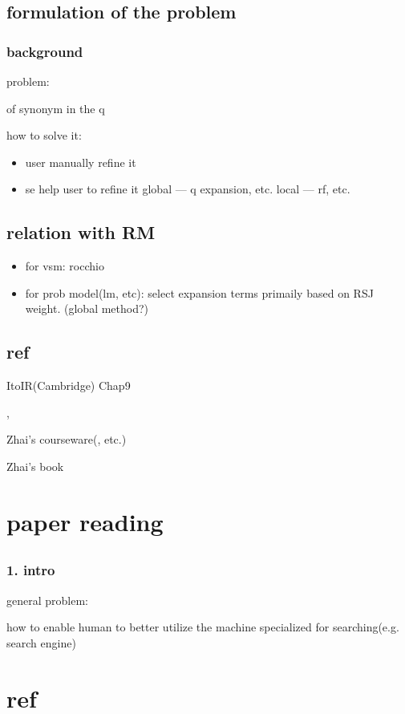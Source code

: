 \documentclass[•]{article}
\begin{document}
\subsection{formulation of the problem}
\subsubsection{background}
problem:

of synonym in the q

how to solve it:

\begin{itemize}
\item user manually refine it
\item se help user to refine it
\subitem global --- q expansion, etc.
\subitem local --- rf, etc.
\end{itemize}


\subsection{relation with RM}
\cite{Lv2011}
\begin{itemize}
\item for vsm:
rocchio
\item for prob model(lm, etc):
select expansion terms primaily based on RSJ weight. (global method?)
\end{itemize}
\subsection{ref}
ItoIR(Cambridge) Chap9

\cite{Lv2011}, \cite{Zhai2001}

Zhai's courseware(\cite{CS598CXZreadings}, etc.)

Zhai's book

\section{paper reading}
\subsection{\cite{White2007}}
\subsubsection{1. intro}
general problem:

how to enable human to better utilize the machine specialized for searching(e.g. search engine)



\section{ref}




\end{document}
